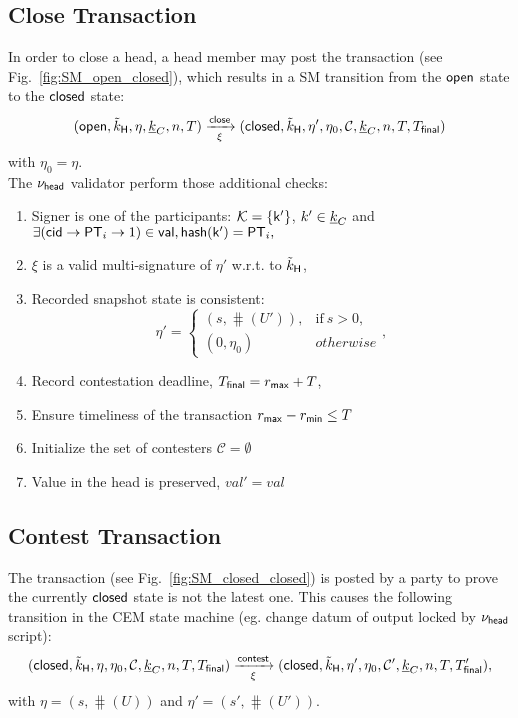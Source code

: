 \subsection{Close Transaction}\label{sec:close-tx}



In order to close a head, a head member may post the \mtxClose{} transaction (see Fig.~\ref{fig:SM_open_closed}), which results in a SM transition
from the $\mathsf{open}$ state to the $\mathsf{closed}$ state:
$$
(\mathsf{open},\tilde{k}_{\mathsf{H}},\eta,\underline{k}_C,n,T) \xrightarrow[\xi]{\mathsf{close}} (\mathsf{closed},\tilde{k}_{\mathsf{H}},\eta',\eta_0,\mathcal{C},\underline{k}_C,n,T,T_{\mathsf{final}}) 
$$
with $\eta_0 = \eta$. \\

\noindent The $\nu_\mathsf{head}$ validator perform those additional checks:
\begin{enumerate}
  \item Signer is one of the participants: $\mathcal K = \{\mathsf{k'}\}$, $k' \in \underline{k}_C$ and
    $
    \exists (\mathsf{cid} \rightarrow \mathsf{PT}_i \rightarrow 1) \in \mathsf{val}, \mathsf{hash}(\mathsf{k'}) = \mathsf{PT}_i,
    $
  \item $\xi$ is a valid multi-signature of $\eta'$ w.r.t. to $\tilde{k}_{\mathsf{H}}$,
  \item Recorded snapshot state is consistent:
    $$
    \eta' = \left\{\begin{array}{ll}
         (s, \hash(U')), & \mathrm{if}\ s > 0,\\
         (0, \eta_0) & \mathit{otherwise} 
    \end{array}\right.,
    $$
  \item Record contestation deadline, $T_{\mathsf{final}} = r_{\mathsf{max}} + T$,
  \item Ensure timeliness of the transaction $r_{\mathsf{max}} - r_{\mathsf{min}} \leq T$ 
  \item Initialize the set of contesters $\mathcal{C} = \emptyset$
  \item Value in the head is preserved, $val' = val$
\end{enumerate}

\subsection{Contest Transaction}\label{sec:contest-tx}



The \mtxContest{} transaction (see
Fig.~\ref{fig:SM_closed_closed}) is posted by a party to prove the currently $\mathsf{closed}$ state is not the latest one. This causes the following transition in the CEM state machine (eg. change datum of output locked by $\nu_\mathsf{head}$ script):
$$
   (\mathsf{closed},\tilde{k}_{\mathsf{H}},\eta,\eta_0,\mathcal{C},\underline{k}_C,n,T,T_{\mathsf{final}}) \xrightarrow[\xi]{\mathsf{contest}} (\mathsf{closed},\tilde{k}_{\mathsf{H}},\eta',\eta_0,\mathcal{C}', \underline{k}_C,n,T,T_{\mathsf{final}}'),
$$
with $\eta = (s, \hash(U))$ and $\eta' = (s', \hash(U')).$ \\

